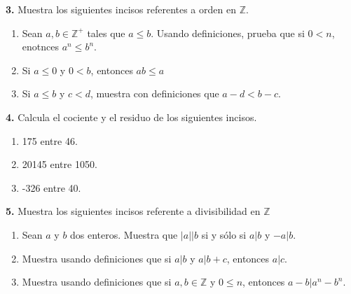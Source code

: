 \documentclass[12pt]{article}
\begin{document}
\vspace{1cm}

%
%
\textbf{3.} Muestra los siguientes incisos referentes a orden en $\mathbb{Z}$.
    \begin{enumerate}[label=\alph*)]
        \item Sean $a, b \in \mathbb{Z}^+$ tales que $a \leq b$. Usando definiciones, prueba que si $0 < n$, enotnces $a^n \leq b^n$. 

        \item Si $ a \leq 0$ y $0 < b$, entonces $ab \leq a$

        \item Si $a \leq b$ y $c < d$, muestra con definiciones que $a - d < b - c$.

    \end{enumerate}
\vspace{1cm}

%
%
\textbf{4.} Calcula el cociente y el residuo de los siguientes incisos.

    \begin{enumerate}[label=\alph*)]

        \item 175 entre 46.

        \item 20145 entre 1050.

        \item -326 entre 40.

    \end{enumerate}
\vspace{1cm}

%
%
\textbf{5.} Muestra los siguientes incisos referente a divisibilidad en $\mathbb{Z}$

    \begin{enumerate}[label=\alph*)]
        \item Sean $a$ y $b$ dos enteros. Muestra que $|a| | b$ si y sólo si $a | b$ y $-a |b$.

        \item Muestra usando definiciones que si $a | b$ y $a | b + c$, entonces $a | c$.

        \item Muestra usando definiciones que si $a , b \in \mathbb{Z}$ y $0 \leq n$, entonces $a - b | a^n - b^n$.
           \end{enumerate}

\vspace{1cm}
\end{document}
